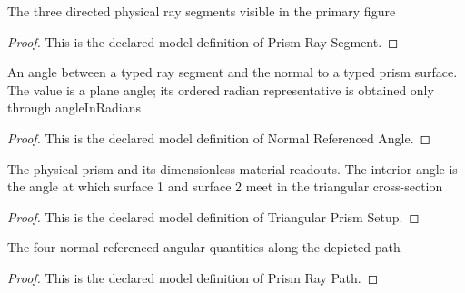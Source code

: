 \begin{definition}
  \label{def:physics:phyx-mini-0016:phyxminiproblems-problemphyxmini0016-prismraysegment}
  The three directed physical ray segments visible in the primary figure
\end{definition}
\begin{proof}
  This is the declared model definition of Prism Ray Segment.
\end{proof}
\begin{definition}
  \label{def:physics:phyx-mini-0016:phyxminiproblems-problemphyxmini0016-normalreferencedangle}
  An angle between a typed ray segment and the normal to a typed prism surface. The value is a plane angle; its ordered radian representative is obtained only through angleInRadians
\end{definition}
\begin{proof}
  This is the declared model definition of Normal Referenced Angle.
\end{proof}
\begin{definition}
  \label{def:physics:phyx-mini-0016:phyxminiproblems-problemphyxmini0016-triangularprismsetup}
  The physical prism and its dimensionless material readouts. The interior angle is the angle at which surface 1 and surface 2 meet in the triangular cross-section
\end{definition}
\begin{proof}
  This is the declared model definition of Triangular Prism Setup.
\end{proof}
\begin{definition}
  \label{def:physics:phyx-mini-0016:phyxminiproblems-problemphyxmini0016-prismraypath}
  The four normal-referenced angular quantities along the depicted path
\end{definition}
\begin{proof}
  This is the declared model definition of Prism Ray Path.
\end{proof}
